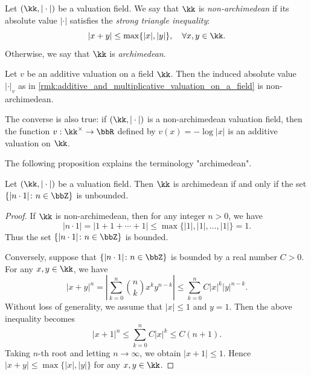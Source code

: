     \begin{definition}\label{def:archimedean_and_non-archimedean_valuation}
        Let \((\kk,|\cdot|)\) be a valuation field.
        We say that \(\kk\) is \emph{non-archimedean} if its absolute value \(|\cdot|\) satisfies the \emph{strong triangle inequality}:
        \[ |x+y|\leq\max\{|x|,|y|\},\quad\forall x,y\in\kk. \]
        Otherwise, we say that \(\kk\) is \emph{archimedean}.
    \end{definition}

    \begin{example}\label{eg:archimedean_absolute_value_and_additive_valuation}
        Let \(v\) be an additive valuation on a field \(\kk\).
        Then the induced absolute value \(|\cdot|_v\) as in \cref{rmk:additive_and_multiplicative_valuation_on_a_field} is non-archimedean.

        The converse is also true: if \((\kk, |\cdot|)\) is a non-archimedean valuation field, 
        then the function \(v: \kk^\times \to \bbR\) defined by \(v(x) = -\log |x|\) is an additive valuation on \(\kk\).
    \end{example}

    The following proposition explains the terminology "archimedean".

    \begin{proposition}\label{prop:archimedean_iff_integer_are_unbound}
        Let \((\kk,|\cdot|)\) be a valuation field.
        Then \(\kk\) is archimedean if and only if the set \(\{|n \cdot 1|\colon n \in \bbZ\}\) is unbounded.
    \end{proposition}
    \begin{proof}
        If \(\kk\) is non-archimedean, then for any integer \(n > 0\), we have
        \[ |n \cdot 1| = |1 + 1 + \cdots + 1| \leq \max\{|1|, |1|, \ldots, |1|\} = 1. \]
        Thus the set \(\{|n \cdot 1|\colon n \in \bbZ\}\) is bounded.

        Conversely, suppose that \(\{|n \cdot 1|\colon n \in \bbZ\}\) is bounded by a real number \(C > 0\).
        For any \(x,y \in \kk\), we have 
        \[ |x + y|^n = \left| \sum_{k=0}^n \binom{n}{k} x^k y^{n-k} \right| \leq \sum_{k=0}^n C |x|^k |y|^{n-k}. \]
        Without loss of generality, we assume that \(|x| \leq 1\) and \(y = 1\).
        Then the above inequality becomes
        \[ |x + 1|^n \leq \sum_{k=0}^n C |x|^k \leq C (n+1). \]
        Taking \(n\)-th root and letting \(n \to \infty\), we obtain \(|x + 1| \leq 1\).
        Hence \(|x + y| \leq \max\{|x|, |y|\}\) for any \(x,y \in \kk\).
    \end{proof}
            

